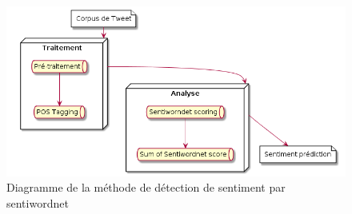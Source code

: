 \begin{figure}[h!]
	\centerline{\includegraphics[scale=0.6]{img/diagramme_sentiwordnet.png}}
	\caption{Diagramme de la méthode de détection de sentiment par sentiwordnet}
\end{figure}
